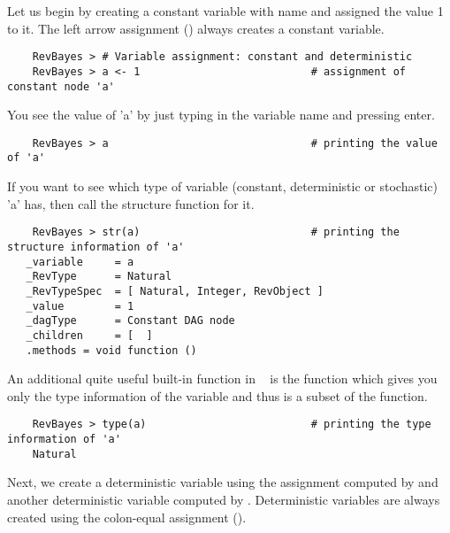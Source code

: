 Let us begin by creating a constant variable with name  and assigned the value 1 to it. 
The left arrow assignment (\cl{<-}) always creates a constant variable.
{\tt \begin{snugshade*}
\begin{lstlisting}    
    RevBayes > # Variable assignment: constant and deterministic
    RevBayes > a <- 1                           # assignment of constant node 'a'
\end{lstlisting}
\end{snugshade*}}
You see the value of 'a' by just typing in the variable name and pressing enter.
{\tt \begin{snugshade*}
\begin{lstlisting}    
    RevBayes > a                                # printing the value of 'a'
\end{lstlisting}
\end{snugshade*}}
If you want to see which type of variable (constant, deterministic or stochastic) 'a' has, then call the structure function for it.
{\tt \begin{snugshade*}
\begin{lstlisting}    
    RevBayes > str(a)                           # printing the structure information of 'a'
   _variable     = a
   _RevType      = Natural
   _RevTypeSpec  = [ Natural, Integer, RevObject ]
   _value        = 1
   _dagType      = Constant DAG node
   _children     = [  ]
   .methods = void function ()
\end{lstlisting}
\end{snugshade*}}
An additional quite useful built-in function in \RevBayes~ is the  function which gives you only the type information of the variable and thus is a subset of the  function.
{\tt \begin{snugshade*}
\begin{lstlisting}    
    RevBayes > type(a)                          # printing the type information of 'a'
    Natural
\end{lstlisting}
\end{snugshade*}}

Next, we create a deterministic variable  using the \cl{:=} assignment computed by  and another deterministic variable  computed by . 
Deterministic variables are always created using the colon-equal assignment (\cl{:=}). 

